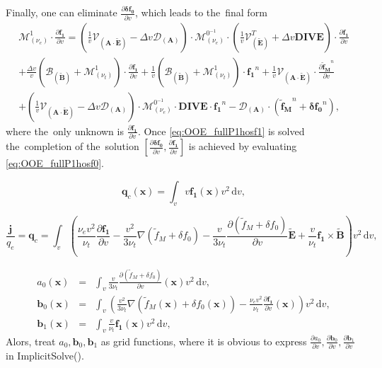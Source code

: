 \documentclass[preprint,12pt]{elsarticle}
\newcommand{\pdv}[2]{\frac{\partial{#1}}{\partial{#2}}}
\newcommand{\vect}[1]{\boldsymbol{#1}}
\newcommand{\matr}[1]{\mathbf{#1}}
\newcommand{\dI}{\text{d}}
\newcommand{\nue}{\nu_{e}}
\newcommand{\nutot}{\nu_{t}}
\newcommand{\vmag}{v}
\newcommand{\tE}{\vect{\tilde{E}}}
\newcommand{\tB}{\vect{\tilde{B}}}
\newcommand{\qe}{q_e}
\newcommand{\tfM}{\tilde{f}_M}
\newcommand{\tvfM}{\vect{\tilde{f}_M}}
\newcommand{\dafzero}{\delta f_0}
\newcommand{\davfzero}{\vect{\delta f_0}}
\newcommand{\fone}{\vect{f_1}}
\newcommand{\MA}{\matr{A}}
\newcommand{\intv}{\int_{\vmag}}
\newcommand{\IM}{\boldsymbol{\mathcal{M}}}
\newcommand{\ID}{\boldsymbol{\mathcal{D}}}
\newcommand{\IV}{\boldsymbol{\mathcal{V}}}
\newcommand{\IB}{\boldsymbol{\mathcal{B}}}
\newcounter{bla}
\begin{document}
Finally, one can eliminate $\pdv{\davfzero}{\vmag}$, 
which leads to the~final form
\begin{multline}
  \IM^1_{(\nue)} \cdot \pdv{\fone}{\vmag}  
  = 
  \left(\frac{1}{\vmag}\IV_{\left(\MA \cdot \tE\right)}
  - \Delta\vmag \ID_{\left(\MA\right)} \right) \cdot
  \IM^{0^{-1}}_{(\nue)} \cdot 
  \left(\frac{1}{\vmag} \IV^T_{\left(\tE\right)} 
  + \Delta\vmag \matr{DIVE}
  \right)
  \cdot \pdv{\fone}{\vmag}
  \\
  +\frac{\Delta\vmag}{\vmag}\left(\IB_{\left( \tB \right)} 
  + \IM^1_{\left( \nutot \right)}\right) 
  \cdot \pdv{\fone}{\vmag} + 
  \frac{1}{\vmag}\left(\IB_{\left( \tB \right)} 
  + \IM^1_{\left( \nutot \right)}\right) 
  \cdot \fone^n
  + \frac{1}{\vmag}\IV_{\left(\MA \cdot \tE\right)} \cdot
  \pdv{\tvfM^n}{\vmag}
  \\ 
  +\left(\frac{1}{\vmag}\IV_{\left(\MA \cdot \tE\right)}
  - \Delta\vmag \ID_{\left(\MA\right)} \right) \cdot
  \IM^{0^{-1}}_{(\nue)} \cdot \matr{DIVE}\cdot\fone^n 
  - \ID_{\left(\MA\right)}\cdot\left(\tvfM^n + \davfzero^n\right),
  \label{eq:OOE_fullP1hosf1}
\end{multline}
where the~only unknown is $\pdv{\fone}{\vmag}$. Once \eqref{eq:OOE_fullP1hosf1}
is solved the~completion of the~solution 
$[\pdv{\davfzero}{\vmag}, \pdv{\fone}{\vmag}]$ is achieved by evaluating 
\eqref{eq:OOE_fullP1hosf0}.
\cite{Dobrev_Kolev_Rieben-High-order_curvilinear_finite_element_methods_for_Lagrangian_hydrodynamics}

\begin{equation}
  \vect{q}_c(\vect{x}) = \intv
  \vmag\fone(\vect{x}) \vmag^2\, \dI\vmag , \nonumber 
\end{equation}

\begin{equation}
  \frac{\vect{j}}{\qe} = \vect{q}_c =
  \intv \left(\frac{\nue\vmag^2}{\nutot}\pdv{\fone}{\vmag}
  - \frac{\vmag^2}{3\nutot}\nabla\left(\tfM + \dafzero\right) - 
  \frac{\vmag}{3\nutot}\pdv{\left(\tfM + \dafzero\right)}{\vmag}\tE
   + \frac{\vmag}{\nutot}\fone\times\tB\right) \vmag^2\, \dI\vmag ,
  \label{eq:OOE_HOFcurrent}
\end{equation}

\begin{eqnarray}
  a_0(\vect{x}) &=& \intv\frac{\vmag}{3 \nutot} \pdv{\left(\tfM + \dafzero\right)}{\vmag}(\vect{x})
  \vmag^2\, \dI\vmag , \nonumber \\
  \vect{b}_{0}(\vect{x}) &=& \intv\left(  
  \frac{\vmag^2}{3 \nutot}\nabla\left(\tfM(\vect{x}) + \dafzero(\vect{x})\right)
  - \frac{\nue\vmag^2}{\nutot}\pdv{\fone}{\vmag}(\vect{x})
  \right)\vmag^2\, \dI\vmag , \nonumber \\
  \vect{b}_{1}(\vect{x}) &=& \intv
  \frac{\vmag}{\nutot}\fone(\vect{x})
  \vmag^2\, \dI\vmag , \nonumber
\end{eqnarray}
Alors, treat $a_0, \vect{b}_{0}, \vect{b}_1$ as grid functions, 
where it is obvious to express 
$\pdv{a_0}{\vmag}, \pdv{\vect{b}_{0}}{\vmag}, \pdv{\vect{b}_1}{\vmag}$ in 
ImplicitSolve().
\end{document}
